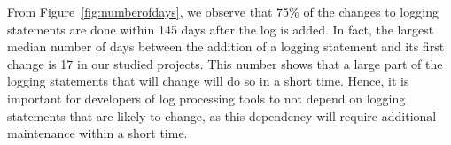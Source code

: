 From Figure~\ref{fig:numberofdays}, we observe that 75\% of the changes to logging statements are done within 145 days after the log is added. In fact, the largest median number of days between the addition of a logging statement and its first change is 17 in our studied projects. This number shows that a large part of the logging statements that will change will do so in a short time. Hence, it is important for developers of log processing tools to not depend on logging statements that are likely to change, as this dependency will require additional maintenance within a short time.








